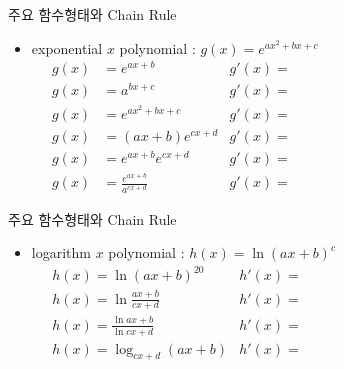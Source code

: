 \documentclass[aspectratio=169]{beamer}
\begin{document}
\begin{frame}{주요 함수형태와 Chain Rule}
  \begin{itemize}
    \item exponential $ x $ polynomial : $ g(x) = e^{ax^2 + bx + c} $
      \begin{align*}
         g(x) & = e^{ax+b}                  & g'(x) = \hspace{6cm}  \\[1em]
         g(x) & = a^{bx+c}                  & g'(x) = \hspace{6cm}  \\[1em]
         g(x) & = e^{ax^2+bx+c}             & g'(x) = \hspace{6cm}  \\[1em]
         g(x) & = (ax+b)e^{cx+d}            & g'(x) = \hspace{6cm}  \\[1em]
         g(x) & = e^{ax+b}e^{cx+d}          & g'(x) = \hspace{6cm}  \\[1em]
         g(x) & = \frac{e^{ax+b}}{a^{cx+d}} & g'(x) = \hspace{6cm}   
      \end{align*}
  \end{itemize}
  
\end{frame}

\begin{frame}{주요 함수형태와 Chain Rule}
  \begin{itemize}
    \item logarithm $ x $ polynomial : $ h(x) = \ln (ax + b)^c $
      \begin{align*}
        & h(x) = \ln (ax + b)^{20}          & h'(x) = \hspace{6cm} \\[1em]
        & h(x) = \ln \frac{ax+b}{cx+d}      & h'(x) = \hspace{6cm} \\[1em]
        & h(x) = \frac{\ln ax+b}{\ln cx+d}  & h'(x) = \hspace{6cm} \\[1em]
        & h(x) = \log_{cx+d} (ax+b)         & h'(x) = \hspace{6cm}    
      \end{align*}
  \end{itemize}
  
\end{frame}
\end{document}
